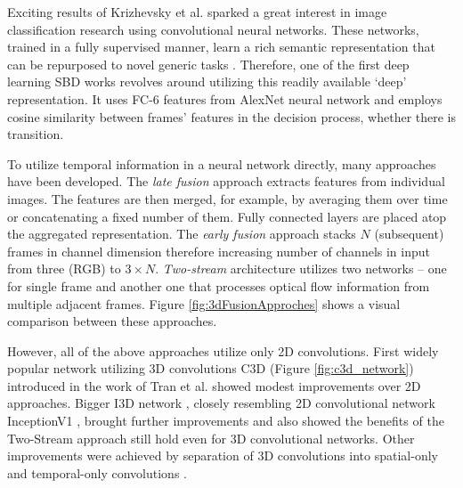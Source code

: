 Exciting results of Krizhevsky et al. \cite{AlexNet} sparked a great interest in image classification research using convolutional neural networks. These networks, trained in a fully supervised manner, learn a rich semantic representation that can be repurposed to novel generic tasks \cite{donahue2014decaf}.
Therefore, one of the first deep learning SBD works \cite{Xu2016AlexNetForSBD} revolves around utilizing this readily available `deep' representation. It uses FC-6 features from AlexNet neural network \cite{AlexNet} and employs cosine similarity between frames' features in the decision process, whether there is transition.

To utilize temporal information in a neural network directly, many approaches have been developed. The \textit{late fusion} \cite{Karpathy_2014_CVPR} approach extracts features from individual images. The features are then merged, for example, by averaging them over time or concatenating a fixed number of them. Fully connected layers are placed atop the aggregated representation. The \textit{early fusion} approach stacks $N$ (subsequent) frames in channel dimension therefore increasing number of channels in input from three (RGB) to $3\times N$. \textit{Two-stream} architecture \cite{SimonyanTwoStream} utilizes two networks -- one for single frame and another one that processes optical flow information from multiple adjacent frames. Figure \ref{fig:3dFusionApproches} shows a visual comparison between these approaches.

However, all of the above approaches utilize only 2D convolutions. First widely popular network utilizing 3D convolutions C3D (Figure \ref{fig:c3d_network}) introduced in the work of Tran et al. \cite{Tran_2015_C3D} showed modest improvements over 2D approaches. Bigger I3D network \cite{Carreira_2017_CVPR}, closely resembling 2D convolutional network InceptionV1 \cite{Szegedy_2015_CVPR}, brought further improvements and also showed the benefits of the Two-Stream approach still hold even for 3D convolutional networks. Other improvements were achieved by separation of 3D convolutions into spatial-only and temporal-only convolutions \cite{Xie_2018_ECCV, Tran_2018_CVPR}.


